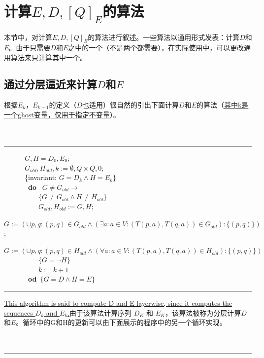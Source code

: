 
\section{计算$E,D,[Q]_E$的算法}
本节中，对计算$E,D,[Q]_E$的算法进行叙述。一些算法以通用形式发表：计算$D$和$E$。由于只需要$D$和$E$之中的一个（不是两个都需要），在实际使用中，可以更改通用算法来只计算其中一个。

\subsection{通过分层逼近来计算$D$和$E$}

根据$E_k$，$E_{k+1}$的定义（$D$也适用）很自然的引出下面计算$D$和$E$的算法（\uline{其中k是一个ghost变量，仅用于指定不变量}）。
\\
\\
\\
\rule{\textwidth}{1pt}
\mbox{　　　}$G,H=D_0,E_0$;\\
\mbox{　　　}$G_{old},H_{old},k:=\emptyset ,Q \times Q,0$;\\
\mbox{　　　\{invariant:} $G=D_k \land H =E_k \}$\\
\mbox{　　　 \textbf{do} } $G \not= G_{old} \longrightarrow$ \\
\mbox{　　　　　}$\{G \not= G_{old} \land H \not= H_{old} \}$ \\
\mbox{　　　　　}$G_{old},H_{old}:=G,H$;\\
\mbox{　　　　　}$G:=(\cup  p,q:(p,q)\in G_{old}\land (\exists  a:a \in V : (T(p,a),T(q,a))\in G_{old} ) : \{(p,q)\})$; \\
\mbox{　　　　　}$G:=(\cup  p,q:(p,q)\in H_{old}\land (\forall  a:a \in V : (T(p,a),T(q,a))\in H_{old} ) : \{(p,q)\})$ \\
\mbox{　　　　　}$\{G=\neg H\}$ \\
\mbox{　　　　　}$k:=k+1$ \\
\mbox{　　　 \textbf{od} }$ \{ G=D \land H=E \}$ \\
\rule{\textwidth}{1pt}
\uline{This algorithm is said to compute D and E layerwise, since it computes the sequences $D_k$ and $E_k$.}由于该算法计算序列 $D_K$ 和 $E_K$，该算法被称为分层计算$D$和$E$。循环中的G和H的更新可以由下面展示的程序中的另一个循环实现。
\\
\\
\\
\rule{\textwidth}{1pt}
